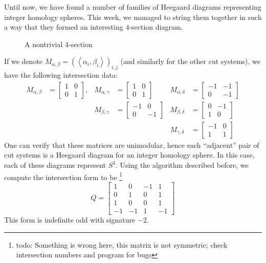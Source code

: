 Until now, we have found a number of families of Heegaard diagrams representing integer homology spheres. This week, we managed to string them together in such a way that they formed an interesting $4$-section diagram.
\begin{figure}[H]
    \centering
    \caption{A nontrivial $4$-section}
    \label{fig:4-section}
\end{figure}
If we denote $M_{\alpha,\beta} = \left(\left< \alpha_i, \beta_i \right>\right)_{i,j}$ (and similarly for the other cut systems), we have the following intersection data:
\begin{align*}
	M_{\alpha,\beta} &= \begin{bmatrix} 1 & 0\\0 & 1 \end{bmatrix}, & M_{\alpha,\gamma} &= \begin{bmatrix} 1 & 0\\0 & 1 \end{bmatrix} & M_{\alpha,\delta} &= \begin{bmatrix} -1 & -1\\0 & -1 \end{bmatrix} \\
	&& M_{\beta,\gamma} &= \begin{bmatrix} -1 & 0\\0 & -1 \end{bmatrix} & M_{\beta,\delta} &= \begin{bmatrix} 0 & -1\\1 & 0 \end{bmatrix} \\
	&&&& M_{\gamma,\delta} &= \begin{bmatrix} -1 & 0\\1 & 1 \end{bmatrix} 
\end{align*}
One can verify that these matrices are unimodular, hence each ``adjacent'' pair of cut systems is a Heegaard diagram for an integer homology sphere. In this case, each of these diagrams represent $S^3$. Using the algorithm described before, we compute the intersection form to be \footnote{todo: Something is wrong here, this matrix is not symmetric; check intersection numbers and program for bugs} \[Q = \begin{bmatrix} 1 & 0 & -1 & 1\\0 & 1 & 0 & 1\\1 & 0 & 0 & 1\\-1 & -1 & 1 & -1 \end{bmatrix} \] This form is indefinite odd with signature $-2$.

